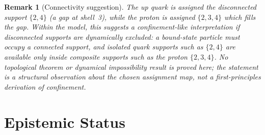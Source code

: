 \documentclass[12pt]{article}
\newtheorem{remark}[theorem]{Remark}
\begin{document}
\begin{remark}[Connectivity suggestion]
The up quark is assigned the disconnected support $\{2,4\}$ (a gap at shell~3), while the proton is assigned $\{2,3,4\}$ which fills the gap. Within the model, this suggests a confinement-like interpretation if disconnected supports are dynamically excluded: a bound-state particle must occupy a connected support, and isolated quark supports such as $\{2,4\}$ are available only inside composite supports such as the proton $\{2,3,4\}$. No topological theorem or dynamical impossibility result is proved here; the statement is a structural observation about the chosen assignment map, not a first-principles derivation of confinement.
\end{remark}

\section{Epistemic Status}\label{sec:epistemic}
\end{document}
